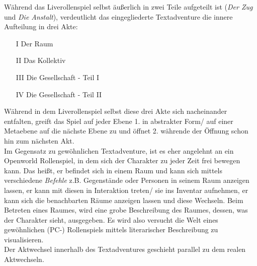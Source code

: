 \documentclass[12pt, a4paper, openany]{report}
\begin{document}
Während das Liverollenspiel selbst äußerlich in zwei Teile aufgeteilt ist (\textit{Der Zug} und \textit{Die Anstalt}), verdeutlicht das eingegliederte Textadventure die innere Aufteilung in drei Akte: 
\begin{itemize}
\item[I] Der Raum
\item[II] Das Kollektiv 
\item[III] Die Gesellschaft - Teil I
\item[IV] Die Gesellschaft - Teil II
\end{itemize}
Während in dem Liverollenspiel selbst diese drei Akte sich nacheinander entfalten, greift das Spiel auf jeder Ebene 1. in abstrakter Form/ auf einer Metaebene auf die nächste Ebene zu und öffnet 2. währende der Öffnung schon hin zum nächsten Akt. \\
Im Gegensatz zu \glqq gewöhnlichen\grqq{} Textadventure, ist es eher angelehnt an ein Openworld Rollenspiel, in dem sich der Charakter zu jeder Zeit frei bewegen kann.
Das heißt, er befindet sich in einem Raum und kann sich mittels verschiedene \textit{Befehle} z.B. Gegenstände oder Personen in seinem Raum anzeigen lassen, er kann mit diesen in Interaktion treten/ sie ins Inventar aufnehmen, er kann sich die benachbarten Räume anzeigen lassen und diese Wechseln. 
Beim Betreten eines Raumes, wird eine grobe Beschreibung des Raumes, dessen, was der Charakter sieht, ausgegeben. 
Es wird also versucht die Welt eines gewöhnlichen (PC-) Rollenspiels mittels literarischer Beschreibung zu visualisieren. \\
Der Aktwechsel innerhalb des Textadventures geschieht parallel zu dem realen Aktwechseln. 
\end{document}
